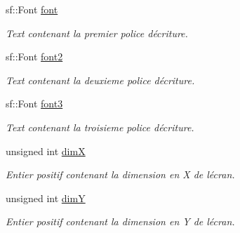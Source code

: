 \begin{DoxyCompactItemize}
sf\+::\+Font \hyperlink{class_s_f_m_l_charger_aa47e87e890becc0c6c941b9535d04a3e}{font}
\begin{DoxyCompactList}\small\item\em Text contenant la premier police d\textquotesingle{}écriture. \end{DoxyCompactList}\item 
\mbox{\label{class_s_f_m_l_charger_af611d8c33bb2fddd5012a427de40e4e0}} 
sf\+::\+Font \hyperlink{class_s_f_m_l_charger_af611d8c33bb2fddd5012a427de40e4e0}{font2}
\begin{DoxyCompactList}\small\item\em Text contenant la deuxieme police d\textquotesingle{}écriture. \end{DoxyCompactList}\item 
\mbox{\label{class_s_f_m_l_charger_a4c8bcb49a0351ee8a9d6171fe4042e3e}} 
sf\+::\+Font \hyperlink{class_s_f_m_l_charger_a4c8bcb49a0351ee8a9d6171fe4042e3e}{font3}
\begin{DoxyCompactList}\small\item\em Text contenant la troisieme police d\textquotesingle{}écriture. \end{DoxyCompactList}\item 
\mbox{\label{class_s_f_m_l_charger_ab4ae50759f35955dbe20f3b8a3da70e7}} 
unsigned int \hyperlink{class_s_f_m_l_charger_ab4ae50759f35955dbe20f3b8a3da70e7}{dimX}
\begin{DoxyCompactList}\small\item\em Entier positif contenant la dimension en X de l\textquotesingle{}écran. \end{DoxyCompactList}\item 
\mbox{\label{class_s_f_m_l_charger_a9300de5c9453c86ce1221b490ff1152b}} 
unsigned int \hyperlink{class_s_f_m_l_charger_a9300de5c9453c86ce1221b490ff1152b}{dimY}
\begin{DoxyCompactList}\small\item\em Entier positif contenant la dimension en Y de l\textquotesingle{}écran. \end{DoxyCompactList}\item 
\mbox{\label{class_s_f_m_l_charger_a45ec6f2520cc838a91654605af533b4e}} 

\end{DoxyCompactItemize}
